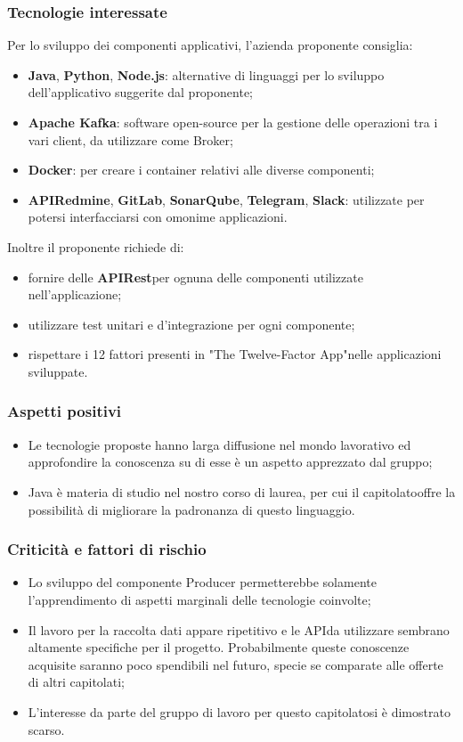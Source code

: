 \subsubsection{Tecnologie interessate}
Per lo sviluppo dei componenti applicativi, l'azienda proponente consiglia:
\begin{itemize}
	\item \textbf{Java}, \textbf{Python}\glo, \textbf{Node.js}\glo: alternative di linguaggi per lo sviluppo dell'applicativo suggerite dal proponente; 
	\item\textbf{Apache Kafka}\glo : software open-source per la gestione delle operazioni tra i vari client, da utilizzare come Broker;
	\item \textbf{Docker}\glo: per creare i container relativi alle diverse componenti;
	\item \textbf{API\glosp Redmine}\glo,  \textbf{GitLab}\glo,  \textbf{SonarQube}\glo,  \textbf{Telegram}\glo, \textbf{Slack}\glo: utilizzate per potersi interfacciarsi con omonime applicazioni.
\end{itemize}
Inoltre il proponente richiede di:
\begin{itemize}
	\item fornire delle \textbf{API\glosp Rest}\glosp per ognuna delle componenti utilizzate nell'applicazione; 
	\item utilizzare test unitari e d'integrazione per ogni componente; 
	\item rispettare i 12 fattori presenti in "The Twelve-Factor App"\glosp nelle applicazioni sviluppate.
\end{itemize}
\subsubsection{Aspetti positivi}
\begin{itemize}
	\item Le tecnologie proposte hanno larga diffusione nel mondo lavorativo ed
	 approfondire la conoscenza su di esse è un aspetto apprezzato dal gruppo;
	\item Java è materia di studio nel nostro corso di laurea, per cui il
	 capitolato\glosp offre la possibilità di migliorare la padronanza di questo
	 linguaggio.
\end{itemize}

\subsubsection{Criticità e fattori di rischio}
\begin{itemize}
	\item Lo sviluppo del componente Producer permetterebbe solamente l'apprendimento di aspetti marginali delle tecnologie coinvolte;
	\item Il lavoro per la raccolta dati appare ripetitivo 
	 e le API\glosp da utilizzare sembrano altamente specifiche per il progetto. Probabilmente queste conoscenze acquisite saranno poco spendibili nel futuro, specie se comparate alle offerte di altri capitolati;
	\item L'interesse da parte del gruppo di lavoro per questo capitolato\glosp si è dimostrato scarso.
\end{itemize}

